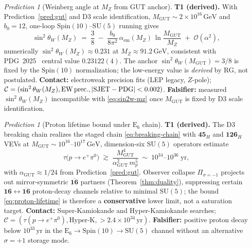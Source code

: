 \documentclass[aps,prd,onecolumn,amsmath,amssymb,nofootinbib,11pt]{revtex4-2}
\numberwithin{equation}{section}
\theoremstyle{plain}
\theoremstyle{definition}
\theoremstyle{remark}
\newtheorem{prediction}[theorem]{Prediction}
\newcommand{\E}[1]{\mathrm{E}_{#1}}
\newcommand{\Spin}{\mathrm{Spin}}
\begin{document}
\begin{prediction}[Weinberg angle at $M_Z$ from GUT anchor]\label{pred:sin2w-mz}
\textbf{T1 (derived).} With Prediction~\ref{pred:gut} and D3 scale identification,
$M_{\mathrm{GUT}}\sim 2\times 10^{16}\,\mathrm{GeV}$ and $b_0=12$, one-loop
$\Spin(10)$--$\mathrm{SU}(5)$ running gives
\begin{equation}\label{eq:sin2w-mz}
  \sin^2\theta_W(M_Z)
  \;=\;
  \frac38
  \;-\;
  \frac{b_0}{8\pi^2}\,\alpha_{\mathrm{em}}(M_Z)\,
  \ln\!\frac{M_{\mathrm{GUT}}}{M_Z}
  \;+\;\mathcal{O}(\alpha^2),
\end{equation}
numerically $\sin^2\theta_W(M_Z)\approx 0.231$ at $M_Z\approx 91.2\,\mathrm{GeV}$,
consistent with PDG~2025~\cite{PDG2025} central value
$0.23122(4)$. The anchor $\sin^2\theta_W(M_{\mathrm{GUT}})=3/8$ is fixed by
the $\Spin(10)$ normalization; the low-energy value is \emph{derived} by RG,
not postulated.
\textbf{Contact:} electroweak precision fits (LEP legacy, $Z$-pole);
$\mathcal{C}=(\sin^2\theta_W(M_Z),\mathrm{EW\,prec.},|{\rm SJET}-{\rm PDG}|<0.002)$.
\textbf{Falsifier:} measured $\sin^2\theta_W(M_Z)$ incompatible with
\eqref{eq:sin2w-mz} once $M_{\mathrm{GUT}}$ is fixed by D3 scale identification.
\end{prediction}

\begin{prediction}[Proton lifetime bound under $\E{6}$ chain]\label{pred:proton-decay}
\textbf{T1 (derived).} The D3 breaking chain realizes the staged chain
\eqref{eq:breaking-chain} with $\mathbf{45}_H$ and $\mathbf{126}_H$ VEVs at
$M_{\mathrm{GUT}}\sim 10^{16}$--$10^{17}\,\mathrm{GeV}$, dimension-six
$\mathrm{SU}(5)$ operators estimate
\begin{equation}\label{eq:proton-lifetime}
  \tau\!\bigl(p\to e^+\pi^0\bigr)
  \;\gtrsim\;
  \frac{M_{\mathrm{GUT}}^{4}}{\alpha_{\mathrm{GUT}}^{2}\,m_{p}^{5}}
  \;\sim\;
  10^{34}\text{--}10^{36}\;\mathrm{yr},
\end{equation}
with $\alpha_{\mathrm{GUT}}\approx 1/24$ from Prediction~\ref{pred:gut}.
Observer collapse $\Pi_{\sigma=-1}$ projects out mirror-symmetric
$\overline{\mathbf{16}}$ partners (Theorem~\ref{thm:duality}), suppressing
certain $\mathbf{16}\leftrightarrow\overline{\mathbf{16}}$ proton-decay
channels relative to minimal $\mathrm{SU}(5)$; the bound \eqref{eq:proton-lifetime}
is therefore a \textbf{conservative} lower limit, not a saturation target.
\textbf{Contact:} Super-Kamiokande and Hyper-Kamiokande searches;
$\mathcal{C}=(\tau(p\to e^+\pi^0),\mathrm{Hyper\text{-}K},>\!2.4\times 10^{34}\,\mathrm{yr})$.
\textbf{Falsifier:} positive proton decay below $10^{33}\,\mathrm{yr}$ in the
$\E{6}\to\Spin(10)\to\mathrm{SU}(5)$ channel without an alternative
$\sigma=+1$ storage mode.
\end{prediction}
\end{document}
